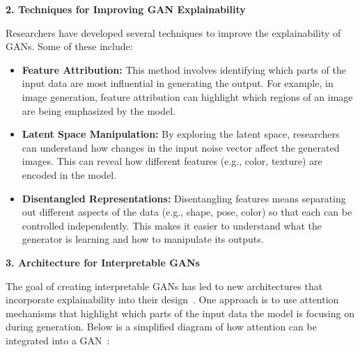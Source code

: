 \textbf{2. Techniques for Improving GAN Explainability}

Researchers have developed several techniques to improve the explainability of GANs. Some of these include:
\begin{itemize}
    \item \textbf{Feature Attribution:} This method involves identifying which parts of the input data are most influential in generating the output. For example, in image generation, feature attribution can highlight which regions of an image are being emphasized by the model.
    \item \textbf{Latent Space Manipulation:} By exploring the latent space, researchers can understand how changes in the input noise vector affect the generated images. This can reveal how different features (e.g., color, texture) are encoded in the model.
    \item \textbf{Disentangled Representations:} Disentangling features means separating out different aspects of the data (e.g., shape, pose, color) so that each can be controlled independently. This makes it easier to understand what the generator is learning and how to manipulate its outputs.
\end{itemize}

\textbf{3. Architecture for Interpretable GANs}

The goal of creating interpretable GANs has led to new architectures that incorporate explainability into their design~\cite{saxena2021generative}. One approach is to use attention mechanisms that highlight which parts of the input data the model is focusing on during generation. Below is a simplified diagram of how attention can be integrated into a GAN~\cite{li2024survey}:

 \begin{center}
\end{center}

